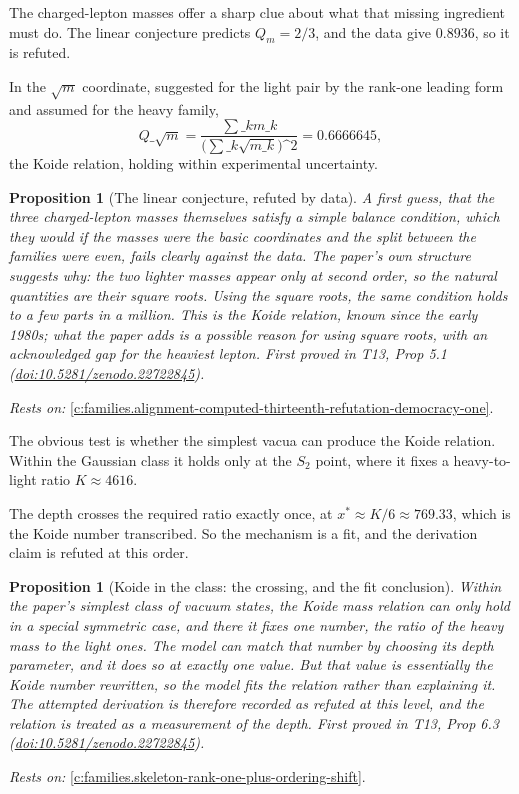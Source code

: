 \documentclass[11pt]{article}
\newtheorem{proposition}[theorem]{Proposition}
\theoremstyle{definition}
\theoremstyle{plain}
\begin{document}
The charged-lepton masses offer a sharp clue about what that missing ingredient must do. The linear conjecture predicts $Q_{m} = 2/3$, and the data give $0.8936$, so it is refuted.

In the $\sqrt{m}$ coordinate, suggested for the light pair by the rank-one leading form and assumed for the heavy family, \[ Q\_{\sqrt{m}} = \frac{\sum\_{k} m\_{k}}{\bigl(\sum\_{k}\sqrt{m\_{k}}\bigr)\^{}{2}} = 0.6666645, \] the Koide relation, holding within experimental uncertainty.

\begin{proposition}[The linear conjecture, refuted by data]\label{c:families.linear-conjecture-refuted-data}
A first guess, that the three charged-lepton masses themselves satisfy a simple balance condition, which they would if the masses were the basic coordinates and the split between the families were even, fails clearly against the data. The paper's own structure suggests why: the two lighter masses appear only at second order, so the natural quantities are their square roots. Using the square roots, the same condition holds to a few parts in a million. This is the Koide relation, known since the early 1980s; what the paper adds is a possible reason for using square roots, with an acknowledged gap for the heaviest lepton.
\emph{First proved in} T13, Prop 5.1 (\href{https://doi.org/10.5281/zenodo.22722845}{doi:10.5281/zenodo.22722845}).
\end{proposition}
\noindent\emph{Rests on:} \ref{c:families.alignment-computed-thirteenth-refutation-democracy-one}.

The obvious test is whether the simplest vacua can produce the Koide relation. Within the Gaussian class it holds only at the $S_{2}$ point, where it fixes a heavy-to-light ratio $K \approx 4616$.

The depth crosses the required ratio exactly once, at $x^{*} \approx K/6 \approx 769.33$, which is the Koide number transcribed. So the mechanism is a fit, and the derivation claim is refuted at this order.

\begin{proposition}[Koide in the class: the crossing, and the fit conclusion]\label{c:families.koide-class-crossing-fit-conclusion}
Within the paper's simplest class of vacuum states, the Koide mass relation can only hold in a special symmetric case, and there it fixes one number, the ratio of the heavy mass to the light ones. The model can match that number by choosing its depth parameter, and it does so at exactly one value. But that value is essentially the Koide number rewritten, so the model fits the relation rather than explaining it. The attempted derivation is therefore recorded as refuted at this level, and the relation is treated as a measurement of the depth.
\emph{First proved in} T13, Prop 6.3 (\href{https://doi.org/10.5281/zenodo.22722845}{doi:10.5281/zenodo.22722845}).
\end{proposition}
\noindent\emph{Rests on:} \ref{c:families.skeleton-rank-one-plus-ordering-shift}.
\end{document}
